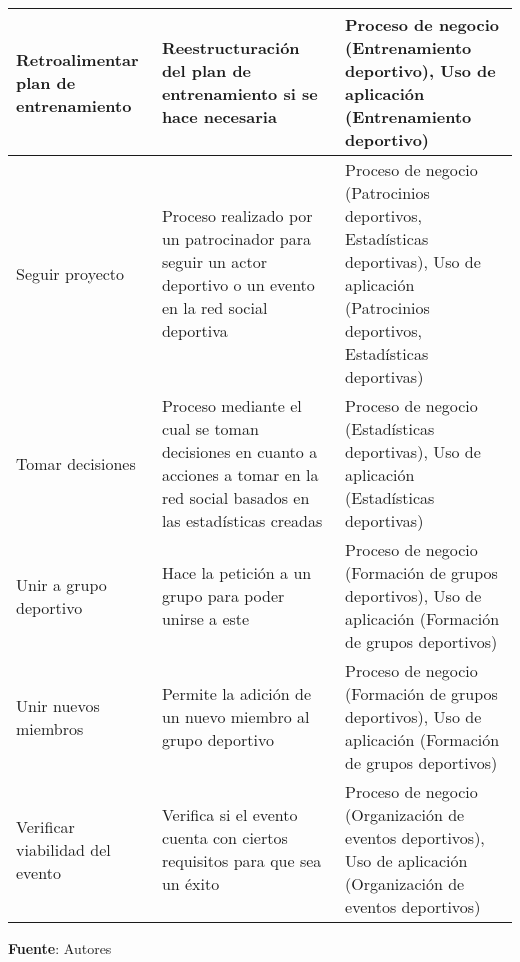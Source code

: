 \begin{center}
\begin{longtable}{|p{4cm}|p{7cm}|p{4cm}|}
		\\
		\hline
		Retroalimentar plan de entrenamiento & 
		Reestructuración del plan de entrenamiento si se hace necesaria & 
		Proceso de negocio (Entrenamiento deportivo), Uso de aplicación (Entrenamiento deportivo)
		\\
		\hline
		Seguir proyecto & 
		Proceso realizado por un patrocinador para seguir un actor deportivo o un evento en la red social deportiva & 
		Proceso de negocio (Patrocinios deportivos, Estadísticas deportivas), Uso de aplicación (Patrocinios deportivos, Estadísticas deportivas)
		\\
		\hline
		Tomar decisiones & 
		Proceso mediante el cual se toman decisiones en cuanto a acciones a tomar en la red social basados en las estadísticas creadas &
		Proceso de negocio (Estadísticas deportivas), Uso de aplicación (Estadísticas deportivas)
		\\
		\hline
		Unir a grupo deportivo & 
		Hace la petición a un grupo para poder unirse a este & 
		Proceso de negocio (Formación de grupos deportivos), Uso de aplicación (Formación de grupos deportivos)
		\\
		\hline
		Unir nuevos miembros & 
		Permite la adición de un nuevo miembro al grupo deportivo & 
		Proceso de negocio (Formación de grupos deportivos), Uso de aplicación (Formación de grupos deportivos)
		\\
		\hline
		Verificar viabilidad del evento & 
		Verifica si el evento cuenta con ciertos requisitos para que sea un éxito & 
		Proceso de negocio (Organización de eventos deportivos), Uso de aplicación (Organización de eventos deportivos)
		\\
		\hline
	\end{longtable}
	\textbf{Fuente}: Autores
\end{center}